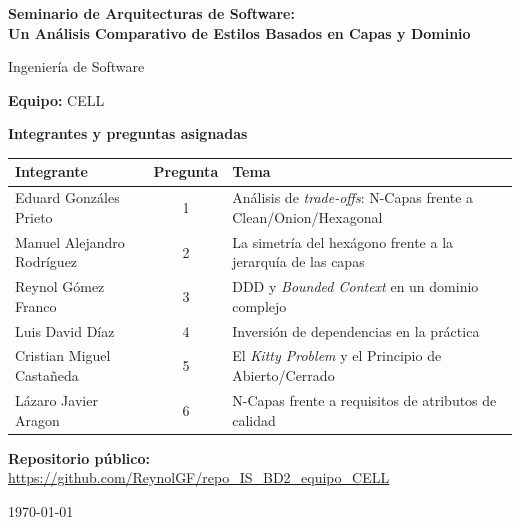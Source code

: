 \documentclass[11pt,a4paper]{article}
\newcommand{\NombreEquipo}{CELL}
\newcommand{\Repositorio}{\url{https://github.com/ReynolGF/repo_IS_BD2_equipo_CELL}}
\begin{document}
\hypersetup{pageanchor=false}
\begin{titlepage}
\centering
\vspace*{1.5cm}
{\LARGE\bfseries Seminario de Arquitecturas de Software:\\[6pt]
Un Análisis Comparativo de Estilos Basados en Capas y Dominio\par}
\vspace{0.8cm}
{\large Ingeniería de Software\par}
\vspace{1.6cm}
{\large\textbf{Equipo:} \NombreEquipo\par}
\vspace{1.4cm}
{\large\bfseries Integrantes y preguntas asignadas\par}
\vspace{0.5cm}
\renewcommand{\arraystretch}{1.35}
\begin{tabular}{@{}l c >{\raggedright\arraybackslash}p{6.4cm}@{}}
\toprule
\textbf{Integrante} & \textbf{Pregunta} & \textbf{Tema} \\
\midrule
Eduard Gonzáles Prieto     & 1 & Análisis de \emph{trade-offs}: N-Capas frente a Clean/Onion/Hexagonal \\
Manuel Alejandro Rodríguez  & 2 & La simetría del hexágono frente a la jerarquía de las capas \\
Reynol Gómez Franco         & 3 & DDD y \emph{Bounded Context} en un dominio complejo \\
Luis David Díaz             & 4 & Inversión de dependencias en la práctica \\
Cristian Miguel Castañeda   & 5 & El \emph{Kitty Problem} y el Principio de Abierto/Cerrado \\
Lázaro Javier Aragon        & 6 & N-Capas frente a requisitos de atributos de calidad \\
\bottomrule
\end{tabular}
\vfill
{\large\textbf{Repositorio público:}\\[4pt] \Repositorio\par}
\vspace{0.6cm}
{\today\par}
\end{titlepage}
\hypersetup{pageanchor=true}

\tableofcontents
\newpage

\end{document}
